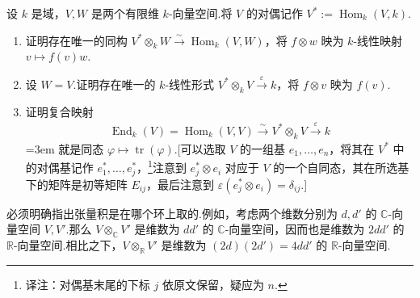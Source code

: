 \begin{exercise*}
设 $k$ 是域，$V,W$ 是两个有限维 $k$-向量空间.将 $V$ 的对偶记作 $V^*:=\operatorname{Hom}_k(V,k)$.
\begin{enumerate}[label=\roman*)]
\item 证明存在唯一的同构 $V^*\otimes_k W\xrightarrow{\sim}\operatorname{Hom}_k(V,W)$，将 $f\otimes w$ 映为 $k$-线性映射 $v\mapsto f(v)w$.
\item 设 $W=V$.证明存在唯一的 $k$-线性形式 $V^*\otimes_k V\xrightarrow{\varepsilon}k$，将 $f\otimes v$ 映为 $f(v)$.
\item 证明复合映射
\begin{align*}
\operatorname{End}_k(V)=\operatorname{Hom}_k(V,V)\xrightarrow{\sim}V^*\otimes_k V\xrightarrow{\varepsilon}k
\end{align*}
\begingroup\emergencystretch=3em
就是同态 $\varphi\mapsto\operatorname{tr}(\varphi)$.[可以选取 $V$ 的一组基 $e_1,\ldots,e_n$，将其在 $V^*$ 中的对偶基记作 $e_1^*,\ldots,e_j^*$，\footnote{译注：对偶基末尾的下标 $j$ 依原文保留，疑应为 $n$.}注意到 $e_j^*\otimes e_i$ 对应于 $V$ 的一个自同态，其在所选基下的矩阵是初等矩阵 $E_{ij}$，最后注意到 $\varepsilon(e_j^*\otimes e_i)=\delta_{ij}$.]
\par\endgroup
\end{enumerate}
\end{exercise*}
\begin{remark*}
必须明确指出张量积是在哪个环上取的.例如，考虑两个维数分别为 $d,d'$ 的 $\mathbb C$-向量空间 $V,V'$.那么 $V\otimes_{\mathbb C}V'$ 是维数为 $dd'$ 的 $\mathbb C$-向量空间，因而也是维数为 $2dd'$ 的 $\mathbb R$-向量空间.相比之下，$V\otimes_{\mathbb R}V'$ 是维数为 $(2d)(2d')=4dd'$ 的 $\mathbb R$-向量空间.
\end{remark*}


